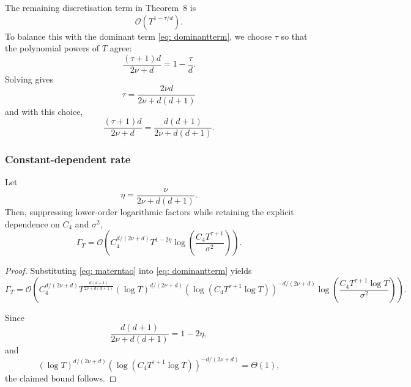 The remaining discretisation term in Theorem~8 is
\begin{equation*}
\mathcal{O}
\left(
T^{1-\tau/d}
\right).
\end{equation*}
To balance this with the dominant term \eqref{eq: dominantterm}, we choose $\tau$ so that the polynomial powers of $T$ agree:
\begin{equation*}
\frac{(\tau+1)d}{2\nu+d}
=
1-\frac{\tau}{d}.
\end{equation*}
Solving gives
\begin{equation}
\tau
=
\frac{2\nu d}{2\nu+d(d+1)}
\label{eq: materntao}
\end{equation}
 and with this choice,
\begin{equation*}
\frac{(\tau+1)d}{2\nu+d}
=
\frac{d(d+1)}{2\nu+d(d+1)}.
\end{equation*}

\subsubsection{Constant-dependent rate}
\begin{proposition} \label{prop: maternexplicit}
Let
\begin{equation*}
\eta
=
\frac{\nu}{2\nu+d(d+1)}.
\end{equation*}
Then, suppressing lower-order logarithmic factors while retaining the explicit dependence on $C_4$ and $\sigma^2$,
\begin{equation*}
\Gamma_T
=
\mathcal{O}
\left(
C_4^{d/(2\nu+d)}
T^{1-2\eta}
\log\!\left(
\frac{C_4T^{\tau+1}}{\sigma^2}
\right)
\right).
\end{equation*}
\end{proposition}

\begin{proof}
Substituting \eqref{eq: materntao} into \eqref{eq: dominantterm} yields
\begin{equation*}
\Gamma_T
=
\mathcal{O}
\left(
C_4^{d/(2\nu+d)}
T^{\frac{d(d+1)}{2\nu+d(d+1)}}
(\log T)^{d/(2\nu+d)}
\left(
\log(C_4T^{\tau+1}\log T)
\right)^{-d/(2\nu+d)}
\log\!\left(
\frac{C_4T^{\tau+1}\log T}{\sigma^2}
\right)
\right).
\end{equation*}

Since
\begin{equation*}
\frac{d(d+1)}{2\nu+d(d+1)}
=
1-2\eta,
\end{equation*}
and
\begin{equation*}
(\log T)^{d/(2\nu+d)}
\left(
\log(C_4T^{\tau+1}\log T)
\right)^{-d/(2\nu+d)}
=
\Theta(1),
\end{equation*}
the claimed bound follows.
\end{proof}

